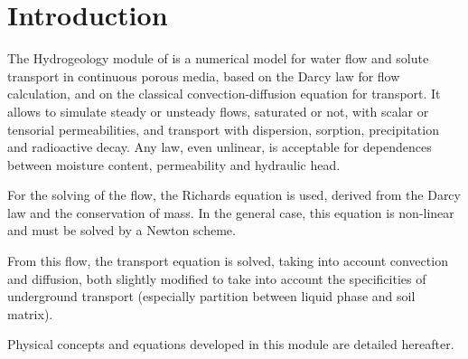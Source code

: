 
%
%
%
%



\section{Introduction}

\hypertarget{groundwater}{}

The Hydrogeology module of \CS is a numerical model for water flow and solute
transport in continuous porous media,
based on the Darcy law for flow calculation, and on the classical
convection-diffusion equation for transport.
It allows to simulate steady or unsteady flows, saturated or not, with scalar or
tensorial permeabilities, and transport with dispersion, sorption,
precipitation and radioactive decay.
Any law, even unlinear, is acceptable for dependences between moisture content,
permeability and hydraulic head.

For the solving of the flow, the Richards equation is used, derived from the
Darcy law and the conservation of mass.
In the general case, this equation is non-linear and must be solved by a Newton
scheme.

From this flow, the transport equation is solved, taking into account convection
and diffusion, both slightly modified to take into account the specificities of
underground transport (especially partition between liquid phase and soil
matrix).

Physical concepts and equations developed in this module are detailed hereafter.

